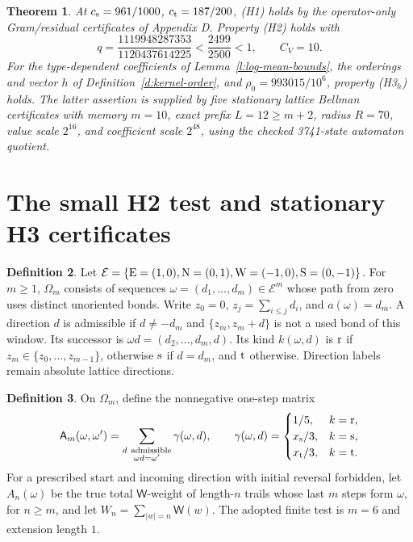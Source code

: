 \documentclass[11pt,reqno]{amsart}
\newtheorem{theorem}{Theorem}[section]
\theoremstyle{definition}
\newtheorem{definition}[theorem]{Definition}
\theoremstyle{remark}
\begin{document}
\begin{theorem}\label{t:inputs}
At \(c_{\rm s}=961/1000\), \(c_{\rm t}=187/200\), (H1) holds
by the operator-only Gram/residual certificates of Appendix D.
Property (H2) holds with
\[
 q=\frac{1119948287353}{1120437614225}<\frac{2499}{2500}<1,
 \qquad C_V=10 .
\]
For the type-dependent coefficients of Lemma~\ref{l:log-mean-bounds},
the orderings and vector \(h\) of Definition~\ref{d:kernel-order},
and \(\rho_0=993015/10^6\), property (H3\(_h\)) holds.
The latter assertion is supplied by five stationary lattice Bellman
certificates with memory \(m=10\), exact prefix \(L=12\ge m+2\),
radius \(R=70\), value scale \(2^{16}\), and coefficient scale
\(2^{48}\), using the checked 3741-state automaton quotient.
\end{theorem}


\section{The small H2 test and stationary H3 certificates}

\begin{definition}\label{d:memory-automaton}
Let \(\mathcal E=\{{\rm E}=(1,0),{\rm N}=(0,1),
{\rm W}=(-1,0),{\rm S}=(0,-1)\}\).
For \(m\ge1\), \(\Omega_m\) consists of sequences
\(\omega=(d_1,\ldots,d_m)\in\mathcal E^m\) whose path from zero
uses distinct unoriented bonds. Write \(z_0=0\),
\(z_j=\sum_{i\le j}d_i\), and \(a(\omega)=d_m\).
A direction \(d\) is admissible if \(d\ne-d_m\) and
\(\{z_m,z_m+d\}\) is not a used bond of this window.
Its successor is \(\omega d=(d_2,\ldots,d_m,d)\).
Its kind \(k(\omega,d)\) is \({\rm r}\) if
\(z_m\in\{z_0,\ldots,z_{m-1}\}\), otherwise \({\rm s}\)
if \(d=d_m\), and \({\rm t}\) otherwise.
Direction labels remain absolute lattice directions.
\end{definition}

\begin{definition}\label{d:memorygrowth}
On \(\Omega_m\), define the nonnegative one-step matrix
\[
 \mathsf A_m(\omega,\omega')=
 \sum_{\substack{d\ {\rm admissible}\\\omega d=\omega'}}
 \gamma(\omega,d),\qquad
 \gamma(\omega,d)=
 \begin{cases}1/5,&k={\rm r},\\
 x_{\rm s}/3,&k={\rm s},\\x_{\rm t}/3,&k={\rm t}.
 \end{cases}
\]
For a prescribed start and incoming direction with initial reversal
forbidden, let \(A_n(\omega)\) be the true total \(\mathsf W\)-weight
of length-\(n\) trails whose last \(m\) steps form \(\omega\),
for \(n\ge m\), and let \(W_n=\sum_{|w|=n}\mathsf W(w)\).
The adopted finite test is \(m=6\) and extension length \(1\).
\end{definition}
\end{document}
